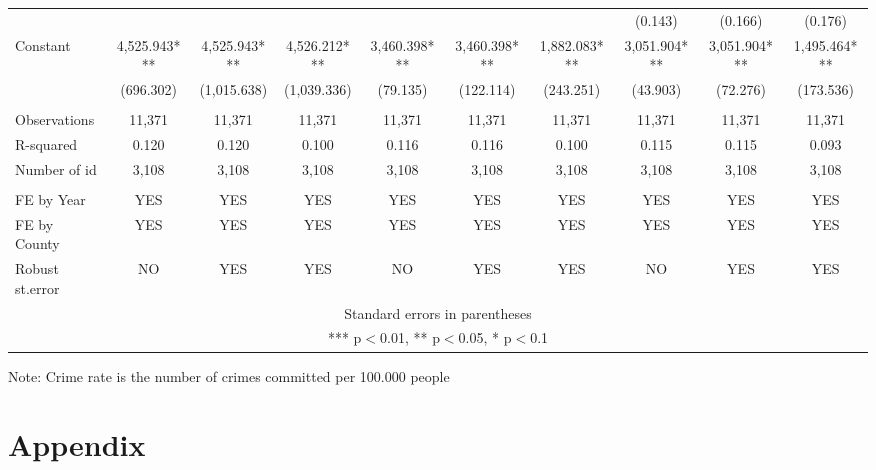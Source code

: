 \documentclass[a4paper,12pt]{article}
\begin{document}
\begin{landscape}
\begin{table}[h!]
\begin{center}
{\begin{tabular}{l c c c c c c c c c }
 &  &  &  &  &  &  & (0.143) & (0.166) & (0.176) \\
Constant & 4,525.943*** & 4,525.943*** & 4,526.212*** & 3,460.398*** & 3,460.398*** & 1,882.083*** & 3,051.904*** & 3,051.904*** & 1,495.464*** \\
 & (696.302) & (1,015.638) & (1,039.336) & (79.135) & (122.114) & (243.251) & (43.903) & (72.276) & (173.536) \\
 &  &  &  &  &  &  &  &  &  \\
Observations & 11,371 & 11,371 & 11,371 & 11,371 & 11,371 & 11,371 & 11,371 & 11,371 & 11,371 \\
R-squared & 0.120 & 0.120 & 0.100 & 0.116 & 0.116 & 0.100 & 0.115 & 0.115 & 0.093 \\
 Number of id & 3,108 & 3,108 & 3,108 & 3,108 & 3,108 & 3,108 & 3,108 & 3,108 & 3,108 \\
\hline \hline
 &  &  &  &  &  &  &  &  &  \\
FE by Year & YES & YES & YES & YES & YES & YES & YES & YES & YES \\
FE by County & YES & YES & YES & YES & YES & YES & YES & YES & YES \\
Robust st.error & NO & YES & YES & NO & YES & YES & NO & YES & YES \\
\hline
\multicolumn{10}{c}{ Standard errors in parentheses} \\
\multicolumn{10}{c}{ *** p$<$0.01, ** p$<$0.05, * p$<$0.1} \\
\end{tabular}
}
\begin{tablenotes}
\begin{footnotesize}
Note: Crime rate is the number of crimes committed per 100.000 people
\end{footnotesize}
\end{tablenotes}
\end{center}
\end{table}
\end{landscape}


\section{Appendix}
\end{document}
